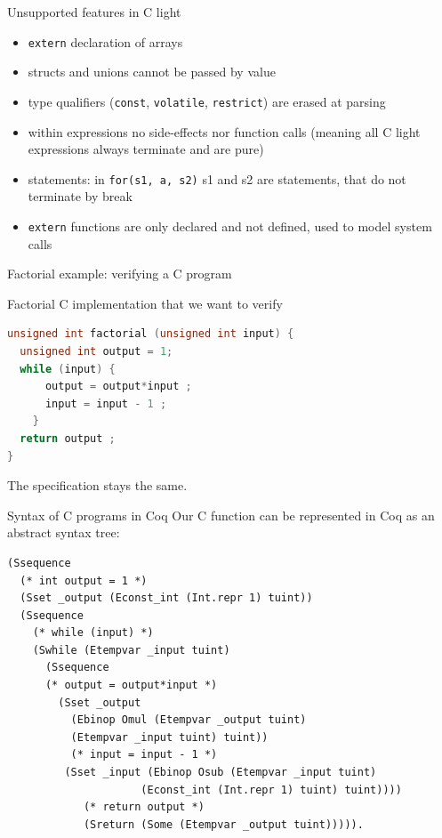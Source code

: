 \documentclass[10pt,usenames,dvipsnames,landscape]{beamer}
\begin{document}
\begin{frame}{Unsupported features in C light}
  \begin{itemize}
  \item \texttt{extern} declaration of arrays
\item structs and unions cannot be passed by value
\item  type qualifiers (\texttt{const}, \texttt{volatile}, \texttt{restrict}) are erased at parsing
\item within expressions no side-effects nor function calls (meaning all C light expressions always terminate and are pure)
\item statements: in \texttt{for(s1, a, s2)} s1 and s2 are statements, that do not terminate by break
\item \texttt{extern} functions are only declared and not defined, used to model system calls
\end{itemize}
  
  \end{frame}


\begin{frame}[fragile]{Factorial example: verifying a C program}

 Factorial C implementation that we want to verify

\begin{lstlisting}[language=C]
unsigned int factorial (unsigned int input) {
  unsigned int output = 1;
  while (input) {
      output = output*input ;
      input = input - 1 ;
    } 
  return output ;
}

\end{lstlisting}

The specification stays the same.

\end{frame}

\begin{frame}[fragile]{ Syntax of C programs in Coq}
Our C function can be represented in Coq as an abstract syntax tree:
  \begin{lstlisting}[language=Coq]
(Ssequence
  (* int output = 1 *)
  (Sset _output (Econst_int (Int.repr 1) tuint)) 
  (Ssequence 
    (* while (input) *)
    (Swhile (Etempvar _input tuint) 
      (Ssequence  
      (* output = output*input *)
        (Sset _output
          (Ebinop Omul (Etempvar _output tuint) 
          (Etempvar _input tuint) tuint)) 
          (* input = input - 1 *)
         (Sset _input (Ebinop Osub (Etempvar _input tuint) 
                     (Econst_int (Int.repr 1) tuint) tuint))))
            (* return output *)
            (Sreturn (Some (Etempvar _output tuint))))).
          
     \end{lstlisting}
     
\end{frame}
\end{document}
